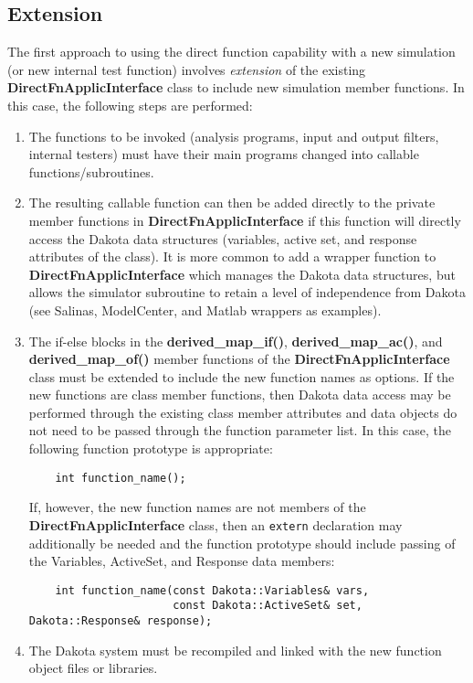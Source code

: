 \subsection{Extension}\label{advint:direct:extension}

The first approach to using the direct function capability with a new
simulation (or new internal test function) involves \emph{extension}
of the existing \textbf{DirectFnApplicInterface} class to include new
simulation member functions. In this case, the following steps are
performed:
\begin{enumerate}
\item The functions to be invoked (analysis programs, input and
  output filters, internal testers) must have their main programs
  changed into callable functions/subroutines.

\item The resulting callable function can then be added directly
  to the private member functions in \textbf{DirectFnApplicInterface}
  if this function will directly access the Dakota data structures
  (variables, active set, and response attributes of the class). It is
  more common to add a wrapper function to
  \textbf{DirectFnApplicInterface} which manages the Dakota data
  structures, but allows the simulator subroutine to retain a level of
  independence from Dakota (see Salinas, ModelCenter, and Matlab
  wrappers as examples).

\item The if-else blocks in the \textbf{derived\_map\_if()},
  \textbf{derived\_map\_ac()}, and \textbf{derived\_map\_of()} member
  functions of the \textbf{DirectFnApplicInterface} class must be
  extended to include the new function names as options. If the new
  functions are class member functions, then Dakota data access may be
  performed through the existing class member attributes and data
  objects do not need to be passed through the function parameter
  list. In this case, the following function prototype is appropriate:
\begin{small}
\begin{verbatim}
    int function_name();
\end{verbatim}
\end{small}
  If, however, the new function names are not members of the
  \textbf{DirectFnApplicInterface} class, then an \texttt{extern}
  declaration may additionally be needed and the function prototype
  should include passing of the Variables, ActiveSet, and Response
  data members:
\begin{small}
\begin{verbatim}
    int function_name(const Dakota::Variables& vars,
                      const Dakota::ActiveSet& set, Dakota::Response& response);
\end{verbatim}
\end{small}

\item The Dakota system must be recompiled and linked with the new
  function object files or libraries.
\end{enumerate}

